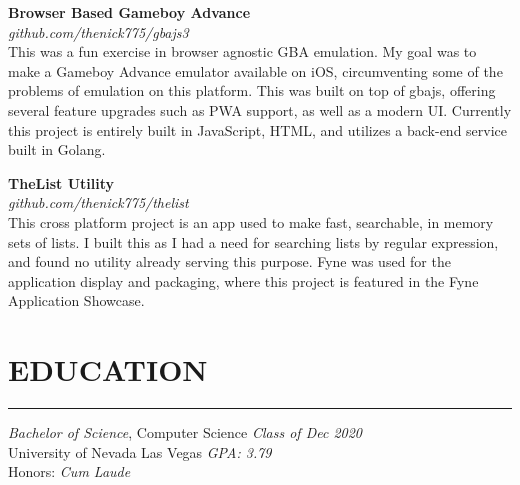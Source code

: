 \documentclass{res}
\begin{document}
\begin{resume}
		{\bf Browser Based Gameboy Advance} \\
			\emph{github.com/thenick775/gbajs3} \hfill \vspace{3pt} \\
			This was a fun exercise in browser agnostic GBA emulation. My goal was to make a Gameboy Advance emulator available on iOS, circumventing some of the problems of emulation on this platform. This was built on top of gbajs, offering several feature upgrades such as PWA support, as well as a modern UI. Currently this project is entirely built in JavaScript, HTML, and utilizes a back-end service built in Golang.

\vspace{-4pt}

		{\bf TheList Utility} \\
			\emph{github.com/thenick775/thelist} \hfill \vspace{3pt} \\
			This cross platform project is an app used to make fast, searchable, in memory sets of lists. I built this as I had a need for searching lists by regular expression, and found no utility already serving this purpose. Fyne was used for the application display and packaging, where this project is featured in the Fyne Application Showcase.

\begin{comment}
\vspace{-4pt}

		{\bf Terbine Map Visualization} \\
			\emph{github.com/thenick775/Terbine-Map} \hfill \vspace{3pt} \\
			This was a fun exercise in data visualization, where fixed coordinate data points in Terbine were plotted and connected on an interactive world map. The data mining was done using Selenium in Python, and data visualization was accomplished using Mapbox in R.
\end{comment}

\vspace{-4pt}

		\section{{EDUCATION}}
    \noindent\rule[0.5ex]{\linewidth}{1pt}
		{\sl Bachelor of Science}, Computer Science \hfill \emph{Class of Dec 2020} \\
		University of Nevada Las Vegas \hfill \emph{GPA: 3.79} \\ Honors: \hfill \emph{Cum Laude} \\ \vspace{-5mm}


\end{resume}
\end{document}
